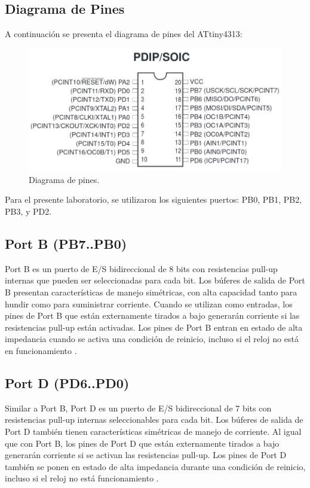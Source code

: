 \subsection{Diagrama de Pines}
A continuación se presenta el diagrama de pines del ATtiny4313:

\begin{figure}[H]
    \centering
    \includegraphics[scale=0.35]{images/Diagrama_pines.jpeg}
    \caption{Diagrama de pines\cite{Atmel2011}.}
    \label{fig:diagrama_pines}
\end{figure}

Para el presente laboratorio, se utilizaron los siguientes puertos: PB0, PB1, PB2, PB3, y PD2. 
\subsection*{Port B (PB7..PB0)}
Port B es un puerto de E/S bidireccional de 8 bits con resistencias pull-up internas que pueden ser seleccionadas para cada bit. Los búferes de salida de Port B presentan características de manejo simétricas, con alta capacidad tanto para hundir como para suministrar corriente. Cuando se utilizan como entradas, los pines de Port B que están externamente tirados a bajo generarán corriente si las resistencias pull-up están activadas. Los pines de Port B entran en estado de alta impedancia cuando se activa una condición de reinicio, incluso si el reloj no está en funcionamiento \cite{Atmel2011}.

\subsection*{Port D (PD6..PD0)}
Similar a Port B, Port D es un puerto de E/S bidireccional de 7 bits con resistencias pull-up internas seleccionables para cada bit. Los búferes de salida de Port D también tienen características simétricas de manejo de corriente. Al igual que con Port B, los pines de Port D que están externamente tirados a bajo generarán corriente si se activan las resistencias pull-up. Los pines de Port D también se ponen en estado de alta impedancia durante una condición de reinicio, incluso si el reloj no está funcionamiento \cite{Atmel2011}.

